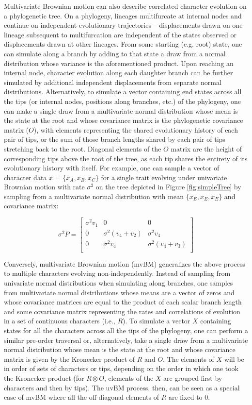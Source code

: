 \documentclass[10pt, twocolumn, twoside]{article}
\begin{document}
Multivariate Brownian motion can also describe correlated character evolution on a phylogenetic tree. On a phylogeny, lineages multifurcate at internal nodes and continue on independent evolutionary trajectories –  displacements drawn on one lineage subsequent to multifurcation are independent of the states observed or displacements drawn at other lineages. From some starting (e.g. root) state, one can simulate along a branch by adding to that state a draw from a normal distribution whose variance is the aforementioned product. Upon reaching an internal node, character evolution along each daughter branch can be further simulated by additional independent displacements from separate normal distributions. Alternatively, to simulate a vector containing end states across all the tips (or internal nodes, positions along branches, etc.) of the phylogeny, one can make a single draw from a multivariate normal distribution whose mean is the state at the root and whose covariance matrix is the phylogenetic covariance matrix ($O$), with elements representing the shared evolutionary history of each pair of tips, or the sum of those branch lengths shared by each pair of tips stretching back to the root. Diagonal elements of the $O$ matrix are the height of corresponding tips above the root of the tree, as each tip shares the entirety of its evolutionary history with itself. For example, one can sample a vector of character data $x$ = $\{x_A, x_B, x_C\}$ for a single trait evolving under univariate Brownian motion with rate $\sigma^2$ on the tree depicted in Figure \ref{fig:simpleTree} by sampling from a multivariate normal distribution with mean $\{x_E, x_E, x_E\}$ and covariance matrix:

{\large\[\sigma^{2}P = \begin{bmatrix}
\sigma^{2}v_1 & 0 & 0 \\
0 & \sigma^{2}(v_4 + v_2) & \sigma^{2}v_4 \\
0 & \sigma^{2}v_4 & \sigma^{2}(v_4 + v_3) \\
\end{bmatrix}\]}

Conversely, multivariate Brownian motion (mvBM) generalizes the above process to multiple characters evolving non-independently. Instead of sampling from univariate normal distributions when simulating along branches, one samples from multivariate normal distributions whose means are a vector of zeros and whose covariance matrices are equal to the product of each scalar branch length and some covariance matrix representing the rates and correlations of evolution in a set of continuous characters (i.e., $R$). To simulate a vector $X$ containing states for all the characters across all the tips of the phylogeny, one can perform a similar pre-order traversal or, alternatively, take a single draw from a multivariate normal distribution whose mean is the state at the root and whose covariance matrix is given by the Kronecker product of $R$ and $O$. The elements of $X$ will be in order of sets of characters or tips, depending on the order in which one took the Kronecker product (for $R \otimes O$, elements of the $X$ are grouped first by characters and then by tips). The uvBM process, then, can be seen as a special case of mvBM where all the off-diagonal elements of $R$ are fixed to 0.
\end{document}
